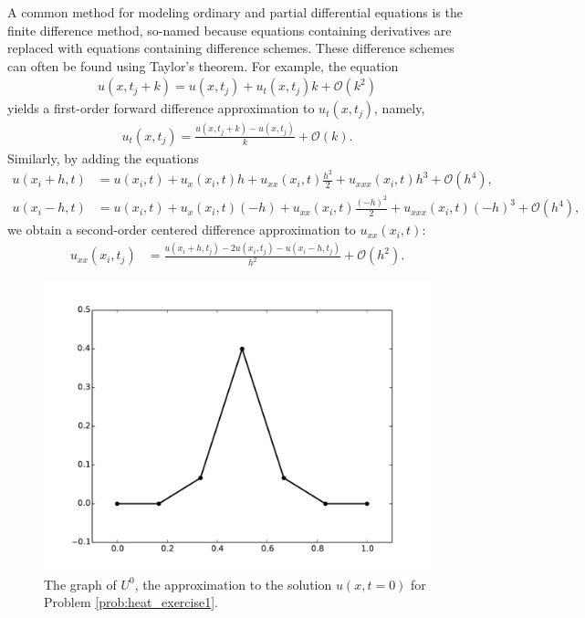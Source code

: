 A common method for modeling ordinary and partial differential equations is the finite difference method, so-named because equations containing derivatives are replaced with equations containing difference schemes.
These difference schemes can often be found using Taylor's theorem.
For example, the equation
\begin{align*}
	u(x,t_j + k) = u(x,t_j) + u_t(x,t_j)k + \mathcal{O}(k^2)
\end{align*}
yields a first-order forward difference approximation to $u_t(x,t_j)$, namely,
\begin{align*}
	u_t(x,t_j ) = \frac{u(x,t_j+k) - u(x,t_j)}{k} + \mathcal{O}(k).
\end{align*}
Similarly, by adding the equations
\begin{align*}
	u(x_i+h,t) &= u(x_i,t) + u_x(x_i,t)h + u_{xx}(x_i,t)\frac{h^2}{2} + u_{xxx}(x_i,t)h^3 + \mathcal{O}(h^4),\\
	u(x_i-h,t) &= u(x_i,t) + u_x(x_i,t)(-h) + u_{xx}(x_i,t)\frac{(-h)^2}{2} + u_{xxx}(x_i,t)(-h)^3 + \mathcal{O}(h^4),
\end{align*}
we obtain a second-order centered difference approximation to $u_{xx}(x_i,t)$:
\begin{align*}
	u_{xx}(x_i,t_j) &= \frac{u(x_i + h,t_j )-2 u(x_i,t_j)- u(x_i - h,t_j)}{h^2} + \mathcal{O}(h^2).
\end{align*}

\begin{figure}
\centering
\includegraphics[width=\textwidth]{heatexercise1a.pdf}
\caption{The graph of $U^{0}$, the approximation to the solution $u(x,t=0)$ for Problem \ref{prob:heat_exercise1}.}
\label{fig:heatexercise1a}
\end{figure}

